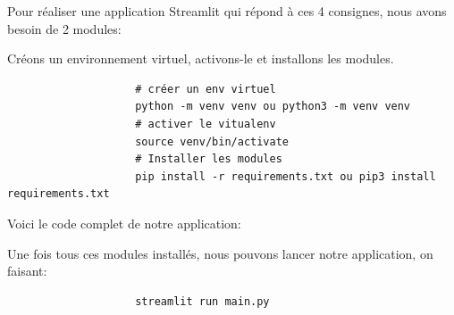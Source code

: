\documentclass[a4paper,11pt]{article}
\begin{document}
            \noindent Pour réaliser une application Streamlit qui répond à ces 4 consignes, nous avons besoin de 2 modules:

            

            \noindent Créons un environnement virtuel, activons-le et installons les modules.

            \begin{tcolorbox}[colback=lightgray!6, colframe=black, left=-40mm, right=5mm, top=2mm, bottom=-2mm, boxrule=0.1mm]
                \begin{verbatim}
                    # créer un env virtuel
                    python -m venv venv ou python3 -m venv venv 
                    # activer le vitualenv
                    source venv/bin/activate 
                    # Installer les modules
                    pip install -r requirements.txt ou pip3 install requirements.txt
                \end{verbatim}
            \end{tcolorbox}

            \noindent Voici le code complet de notre application:
            

            \noindent Une fois tous ces modules installés, nous pouvons lancer notre application, on faisant:
            \begin{tcolorbox}[colback=lightgray!6, colframe=black, left=-40mm, right=5mm, top=2mm, bottom=-2mm, boxrule=0.1mm]
                \begin{verbatim}
                    streamlit run main.py
                \end{verbatim}
            \end{tcolorbox}
        
\end{document}
